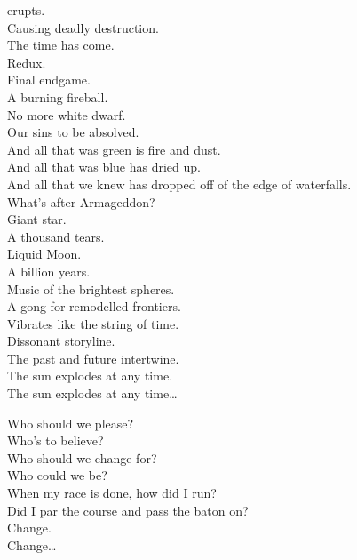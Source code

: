  erupts. \\
Causing deadly destruction. \\
The time has come. \\
Redux. \\
Final endgame. \\
A burning fireball. \\
No more white dwarf. \\
Our sins to be absolved. \\

And all that was green is fire and dust. \\
And all that was blue has dried up. \\
And all that we knew has dropped off of the edge of waterfalls. \\
What's after Armageddon? \\

Giant star. \\
A thousand tears. \\
Liquid Moon. \\
A billion years. \\
Music of the brightest spheres. \\
A gong for remodelled frontiers. \\
Vibrates like the string of time. \\
Dissonant storyline. \\
The past and future intertwine. \\
The sun explodes at any time. \\

The sun explodes at any time… \\




Who should we please? \\
Who's to believe? \\
Who should we change for? \\
Who could we be? \\
When my race is done, how did I run? \\
Did I par the course and pass the baton on? \\

Change. \\
Change… \\

